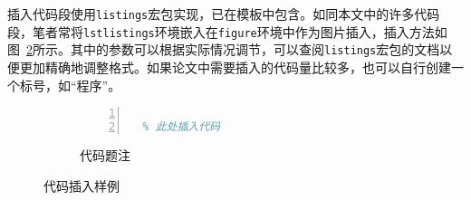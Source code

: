 插入代码段使用\texttt{listings}宏包实现，已在模板中包含。如同本文中的许多代码段，笔者常将\texttt{lstlistings}环境嵌入在\texttt{figure}环境中作为图片插入，插入方法如图~\ref{fig:listings}所示。其中的参数可以根据实际情况调节，可以查阅\texttt{listings}宏包的文档以便更加精确地调整格式。如果论文中需要插入的代码量比较多，也可以自行创建一个标号，如``程序''。


\begin{figure}[h]
  {
  \fontsize{10pt}{12pt}\selectfont
  \setmainfont{Courier New}
  \begin{TeXlstlisting}
\begin{figure}[h] {
  \fontsize{10pt}{12pt}\selectfont
  \setmainfont{Courier New}
  \begin{lstlisting}[language=tex,showstringspaces=false,numbers=left]

  % 此处插入代码

  \end{lstlisting}
}
\caption{代码题注}
\label{fig:listings}
\end{figure}

  \end{TeXlstlisting}
  }
\caption{代码插入样例}
\label{fig:listings}
\end{figure}
